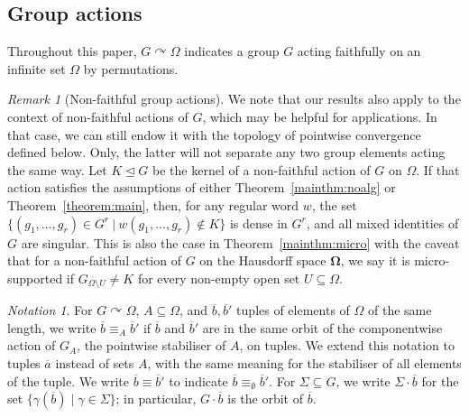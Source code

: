 \documentclass{article}
\theoremstyle{remark}
\newtheorem{remark}[theorem]{Remark}
\newtheorem{notation}[theorem]{Notation}
\theoremstyle{definition}
\def\acts{\curvearrowright}
\newcommand{\spOm}{\bm{\Omega}}
\begin{document}
{\subsection{Group actions}

Throughout this paper, $G\acts\Omega$ indicates a 
group $G$ {acting}  {faithfully} 
on an {infinite} set $\Omega$ by permutations. %

\begin{remark}[Non-faithful group actions] \label{rem:unfaithful} {We note that our results also apply to the context of non-faithful actions of $G$, which may be helpful for applications. In that case, we can still endow it with the topology of pointwise convergence defined below. %
Only, the latter will not separate any two group elements acting the same way. {Let $K\unlhd G$ be the kernel of a non-faithful action of $G$ on $\Omega$.}
If that action satisfies the assumptions of either Theorem~\ref{mainthm:noalg} or Theorem~\ref{theorem:main}, then, {for any regular word $w$,} the set $\{(g_1,\ldots,g_r)\in G^r\ \vert \ w(g_1,\ldots,g_r)\not\in K\}$ is dense in $G^r$, %
and %
all mixed identities of $G$ are singular. This is also the case in Theorem~\ref{mainthm:micro} with the caveat that for a non-faithful action of $G$ on the Hausdorff space $\spOm$, we say it is micro-supported if $G_{\Omega\setminus U}\neq K$ for every non-empty open set $U\subseteq\Omega$.}
\end{remark}



\begin{notation} For $G\acts\Omega$, $A\subseteq\Omega$, and $\overline{b}, \overline{b}'$ tuples of elements of $\Omega$ of the same length, we write $\overline{b}\equiv_A\overline{b}'$ if $\overline{b}$ and $\overline{b}'$ are in the same orbit of the componentwise action of $G_A$, the pointwise stabiliser of $A$, on tuples. We extend this notation to tuples  $\overline a$ instead of sets $A$, with the same meaning for the stabiliser of all elements of the tuple.   We write $\overline{b}\equiv\overline{b}'$ to indicate $\overline{b}\equiv_\emptyset\overline{b}'$. For $\Sigma\subseteq G$, we write $\Sigma\cdot \overline b$ for the set $\{\gamma(\overline{b})\;|\; \gamma\in \Sigma\}$; in particular, $G\cdot  \overline{b}$ is the orbit of $\overline b$. 
\end{notation}

}
\end{document}
